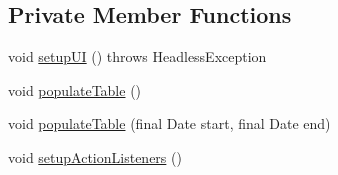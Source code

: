 \subsection*{Private Member Functions}
\begin{DoxyCompactItemize}
\item 
void \mbox{\hyperlink{classcom_1_1activitytracker_1_1_main_window_a53a019623a37b950473359fc625b6423}{setup\+UI}} ()  throws Headless\+Exception 
\item 
void \mbox{\hyperlink{classcom_1_1activitytracker_1_1_main_window_ae3955dd50087d95257d029b9c67ac185}{populate\+Table}} ()
\item 
void \mbox{\hyperlink{classcom_1_1activitytracker_1_1_main_window_a351c3d78c28ae23cd645e86fe30688c7}{populate\+Table}} (final Date start, final Date end)
\item 
void \mbox{\hyperlink{classcom_1_1activitytracker_1_1_main_window_a76b3e8567b228ccd26f09c15ebaddb72}{setup\+Action\+Listeners}} ()
\end{DoxyCompactItemize}

